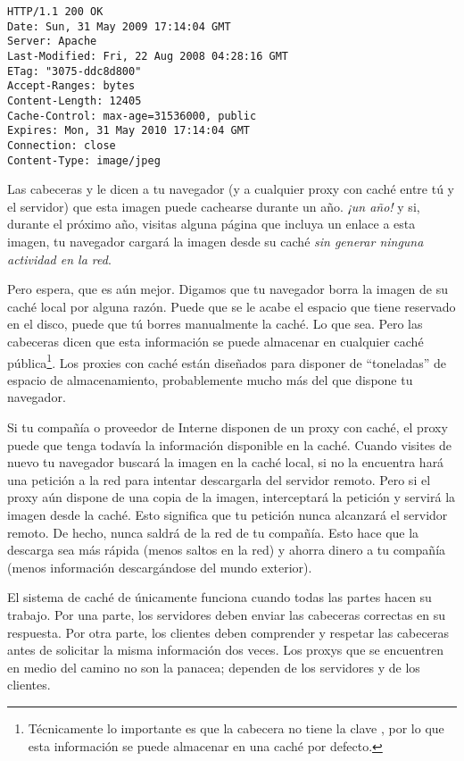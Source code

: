 \noindent\begin{minipage}{\textwidth}
\begin{lstlisting}[mathescape=True]
HTTP/1.1 200 OK
Date: Sun, 31 May 2009 17:14:04 GMT
Server: Apache
Last-Modified: Fri, 22 Aug 2008 04:28:16 GMT
ETag: "3075-ddc8d800"
Accept-Ranges: bytes
Content-Length: 12405
Cache-Control: max-age=31536000, public
Expires: Mon, 31 May 2010 17:14:04 GMT
Connection: close
Content-Type: image/jpeg
\end{lstlisting}
\end{minipage}

Las cabeceras  y  le dicen a tu navegador (y a cualquier proxy con caché entre tú y el servidor) que esta imagen puede cachearse durante un año. \emph{¡un año!} y si, durante el próximo año, visitas alguna página que incluya un enlace a esta imagen, tu navegador cargará la imagen desde su caché \emph{sin generar ninguna actividad en la red}.

Pero espera, que es aún mejor. Digamos que tu navegador borra la imagen de su caché local por alguna razón. Puede que se le acabe el espacio que tiene reservado en el disco, puede que tú borres manualmente la caché. Lo que sea. Pero las cabeceras  dicen que esta información se puede almacenar en cualquier caché pública\footnote{Técnicamente lo importante es que la cabecera  no tiene la clave , por lo que esta información se puede almacenar en una caché por defecto.}. Los proxies con caché están diseñados para disponer de ``toneladas'' de espacio de almacenamiento, probablemente mucho más del que dispone tu navegador.

Si tu compañía o proveedor de Interne disponen de un proxy con caché, el proxy puede que tenga todavía la información disponible en la caché. Cuando visites de nuevo  tu navegador buscará la imagen en la caché local, si no la encuentra hará una petición a la red para intentar descargarla del servidor remoto. Pero si el proxy aún dispone de una copia de la imagen, interceptará la petición y servirá la imagen desde la caché. Esto significa que tu petición nunca alcanzará el servidor remoto. De hecho, nunca saldrá de la red de tu compañía. Esto hace que la descarga sea más rápida (menos saltos en la red) y ahorra dinero a tu compañía (menos información descargándose del mundo exterior).

El sistema de caché de  únicamente funciona cuando todas las partes hacen su trabajo. Por una parte, los servidores deben enviar las cabeceras correctas en su respuesta. Por otra parte, los clientes deben comprender y respetar las cabeceras antes de solicitar la misma información dos veces. Los proxys que se encuentren en medio del camino no son la panacea; dependen de los servidores y de los clientes.

